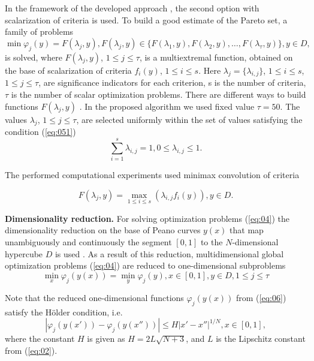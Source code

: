 \documentclass[runningheads]{llncs}
\begin{document}
In the framework of the developed approach \cite{Konnov2025}, the second option with scalarization of criteria is used. To build a good estimate of the Pareto set, a family of problems
\begin{equation}
\label{eq:04}
\min {\varphi_j (y)}=F(\lambda_j,y),F(\lambda_j,y) \in \{F(\lambda_1,y),F(\lambda_2,y),\dots,F(\lambda_\tau,y)\},y\in D,
\end{equation}
is solved,  where $F(\lambda_j,y)$, $1 \leq j \leq \tau$, is a multiextremal function, obtained on the base of scalarization of criteria $f_i(y)$, $1 \leq i \leq s$. Here $\lambda_j=\{\lambda_{i,j}\}$, $1 \leq i \leq s$, $1 \leq j \leq \tau$, are significance indicators for each criterion, s is the number of criteria, $\tau$ is the number of scalar optimization problems. There are different ways to build functions $F(\lambda_j,y)$ \cite{Miettinen1999,Konnov2025,Marler2004}.  
In the proposed algorithm we used fixed value $\tau = 50$. The values $\lambda_j$, $1 \leq j \leq \tau$, are selected uniformly within the set of values satisfying the condition (\ref{eq:051})
\begin{equation}
\label{eq:051}
\sum_{i=1}^s {\lambda_{i,j}} = 1, 0 \leq \lambda_{i,j} \leq 1.
\end{equation}

The performed computational experiments used minimax convolution of criteria

\begin{equation}
\label{eq:05}
F(\lambda_j, y) = \max_{1 \leq i \leq s} \left(\lambda_{i,j} f_i (y)\right), y \in D.
\end{equation}

\textbf{Dimensionality reduction.} For solving optimization problems (\ref{eq:04}) the dimensionality reduction on the base of Peano curves $y(x)$ that map unambiguously and continuously the segment $[0,1]$ to the $N$-dimensional hypercube $D$ is used \cite{Konnov2025,Gergel2019_2,GergelKozinov2020}. As a result of this reduction, multidimensional global optimization problems (\ref{eq:04}) are reduced to one-dimensional subproblems
\begin{equation}
\label{eq:06}
\min_x {\varphi_j(y(x))} = \min_y {\varphi_j(y)}, x \in [0,1], y \in D, 1 \leq j \leq \tau
\end{equation}

Note that the reduced one-dimensional functions $\varphi_j (y(x))$ from (\ref{eq:06}) satisfy the H{\" o}lder condition, i.e.
\begin{equation}
\label{eq:07}
|\varphi_j(y(x')) - \varphi_j(y(x''))| \leq H |x' - x''|^{1/N} , x \in [0,1],
\end{equation}
where the constant $H$ is given as $H=2L\sqrt{N+3}$, and $L$ is the Lipschitz constant from (\ref{eq:02}).
\end{document}
